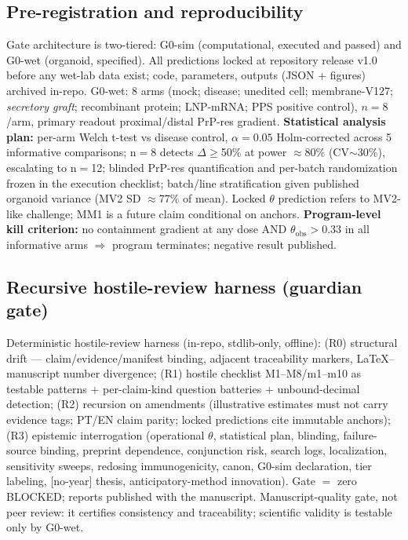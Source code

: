 \documentclass[10pt,twocolumn]{article}
\begin{document}
\subsection{Pre-registration and reproducibility}
Gate architecture is two-tiered: G0-sim (computational, executed and passed) and G0-wet (organoid, specified). All predictions locked at repository release v1.0 before any wet-lab data exist; code, parameters, outputs (JSON + figures) archived in-repo. G0-wet: 8 arms (mock; disease; unedited cell; membrane-V127; \emph{secretory graft}; recombinant protein; LNP-mRNA; PPS positive control), $n{=}8$/arm, primary readout proximal/distal PrP-res gradient. \textbf{Statistical analysis plan:} per-arm Welch t-test vs disease control, $\alpha{=}0.05$ Holm-corrected across 5 informative comparisons; n$=$8 detects $\Delta\ge$50\% at power $\approx$80\% (CV$\sim$30\%), escalating to n$=$12; blinded PrP-res quantification and per-batch randomization frozen in the execution checklist; batch/line stratification given published organoid variance (MV2 SD $\approx$77\% of mean). Locked $\theta$ prediction refers to MV2-like challenge; MM1 is a future claim conditional on anchors. \textbf{Program-level kill criterion:} no containment gradient at any dose AND $\theta_{\text{obs}}>0.33$ in all informative arms $\Rightarrow$ program terminates; negative result published.

\subsection{Recursive hostile-review harness (guardian gate)}
Deterministic hostile-review harness (in-repo, stdlib-only, offline): (R0) structural drift --- claim/evidence/manifest binding, adjacent traceability markers, LaTeX--manuscript number divergence; (R1) hostile checklist M1--M8/m1--m10 as testable patterns $+$ per-claim-kind question batteries $+$ unbound-decimal detection; (R2) recursion on amendments (illustrative estimates must not carry evidence tags; PT/EN claim parity; locked predictions cite immutable anchors); (R3) epistemic interrogation (operational $\theta$, statistical plan, blinding, failure-source binding, preprint dependence, conjunction risk, search logs, localization, sensitivity sweeps, redosing immunogenicity, canon, G0-sim declaration, tier labeling, [no-year] thesis, anticipatory-method innovation). Gate $=$ zero BLOCKED; reports published with the manuscript. Manuscript-quality gate, not peer review: it certifies consistency and traceability; scientific validity is testable only by G0-wet.
\end{document}
